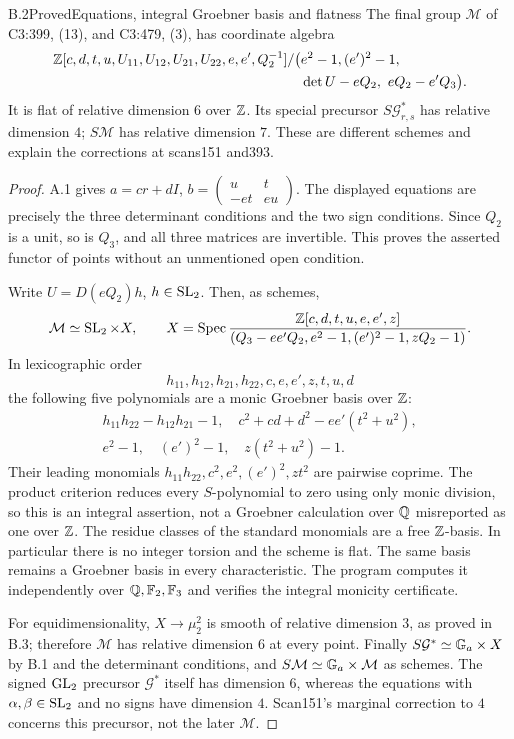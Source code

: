 \begin{statement}{B.2}{Proved}{Equations, integral Groebner basis and flatness}
The final group $\mathcal M$ of C3:399, (13), and C3:479, (3),
has coordinate algebra
\[
\begin{split}
\mathbb Z[c,d,t,u,U_{11},U_{12},U_{21},U_{22},e,e',Q_2^{-1}]/
\big(&e^2-1,(e')^2-1,\\
&\det U-eQ_2,\ eQ_2-e'Q_3\big).
\end{split}
\]
It is flat of relative dimension $6$ over $\mathbb Z$. Its special
precursor $S\mathcal G^*_{r,s}$ has relative dimension $4$;
$S\mathcal M$ has relative dimension $7$. These are different
schemes and explain the corrections at scans151 and393.
\end{statement}
\begin{proof}
A.1 gives $a=cr+dI$, $b=\left(\begin{smallmatrix}u&t\\-et&eu\end{smallmatrix}\right)$.
The displayed equations are precisely the three determinant
conditions and the two sign conditions. Since $Q_2$ is a unit,
so is $Q_3$, and all three matrices are invertible. This proves
the asserted functor of points without an unmentioned open
condition.

Write $U=D(eQ_2)h$, $h\in\operatorname{SL}_2$. Then, as schemes,
\[
 \mathcal M\simeq\operatorname{SL}_2\times X,\qquad
 X=\operatorname{Spec}\frac{\mathbb Z[c,d,t,u,e,e',z]}
 {(Q_3-ee'Q_2,e^2-1,(e')^2-1,zQ_2-1)}.
\]
In lexicographic order
\[
 h_{11},h_{12},h_{21},h_{22},c,e,e',z,t,u,d
\]
the following five polynomials are a monic Groebner basis over $\mathbb Z$:
\[
\begin{gathered}
 h_{11}h_{22}-h_{12}h_{21}-1,\quad
 c^2+cd+d^2-ee'(t^2+u^2),\\
 e^2-1,\quad(e')^2-1,\quad z(t^2+u^2)-1.
\end{gathered}
\]
Their leading monomials
$h_{11}h_{22},c^2,e^2,(e')^2,zt^2$ are pairwise coprime.
The product criterion reduces every $S$-polynomial to zero using
only monic division, so this is an integral assertion, not a
Groebner calculation over $\mathbb Q$ misreported as one over $\mathbb Z$.
The residue classes of the standard monomials are a free
$\mathbb Z$-basis. In particular there is no integer torsion and the
scheme is flat. The same basis remains a Groebner basis in every
characteristic. The program computes it independently over
$\mathbb Q,\mathbb F_2,\mathbb F_3$ and verifies the integral monicity certificate.

For equidimensionality, $X\to\mu_2^2$ is smooth of relative
dimension $3$, as proved in B.3; therefore $\mathcal M$ has
relative dimension $6$ at every point. Finally
$S\mathcal G^*\simeq\mathbb G_a\times X$ by B.1 and the determinant
conditions, and $S\mathcal M\simeq\mathbb G_a\times\mathcal M$ as
schemes. The signed $\operatorname{GL}_2$ precursor $\mathcal G^*$ itself has
dimension $6$, whereas the equations with $\alpha,\beta\in\operatorname{SL}_2$
and no signs have dimension $4$. Scan151's marginal correction
to $4$ concerns this precursor, not the later $\mathcal M$.
\end{proof}

